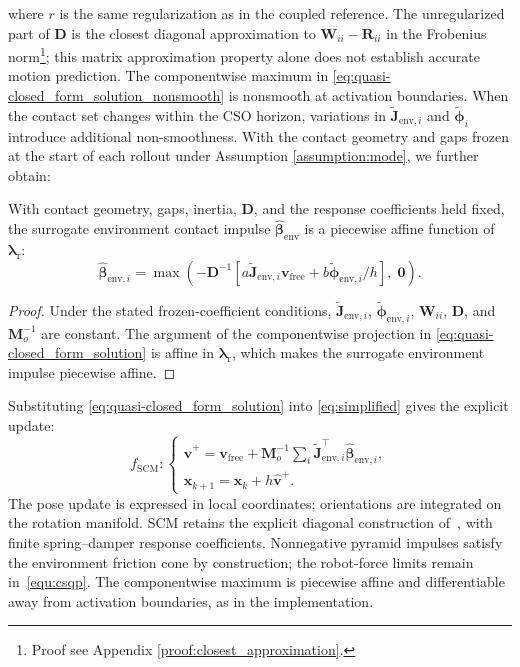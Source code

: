 where $r$ is the same regularization as in the coupled reference. The unregularized part of $\boldsymbol{D}$ is the closest diagonal approximation to $\boldsymbol{W}_{ii}-\boldsymbol{R}_{ii}$ in the Frobenius norm\footnote{Proof see Appendix \ref{proof:closest_approximation}.}; this matrix approximation property alone does not establish accurate motion prediction. The componentwise maximum in \eqref{eq:quasi-closed_form_solution_nonsmooth} is nonsmooth at activation boundaries. When the contact set changes within the CSO horizon, variations in $\boldsymbol{\tilde{J}}_{\text{env},i}$ and $\boldsymbol{\tilde{\phi}}_i$ introduce additional non-smoothness. With the contact geometry and gaps frozen at the start of each rollout under Assumption \ref{assumption:mode}, we further obtain:
\begin{lemma}\label{lemma2:piecewise-linear}
With contact geometry, gaps, inertia, $\boldsymbol{D}$, and the response coefficients held fixed, the surrogate environment contact impulse $\boldsymbol{\hat{\beta}}_{\text{env}}$ is a piecewise affine function of $\boldsymbol{\lambda}_{\text{r}}$:
\begin{equation}
\boldsymbol{\hat{\beta}}_{\text{env}, i}
=
\max
\left(
-
\boldsymbol{D}^{-1}
\left[
a\boldsymbol{\tilde{J}}_{\text{env},i} \boldsymbol{v}_{\mathrm{free}}
+b\boldsymbol{\tilde{\phi}}_{\text{env},i}/h
\right],
\;\boldsymbol{0}
\right).
\label{eq:quasi-closed_form_solution}
\end{equation}
\end{lemma}
\begin{proof}
 \renewcommand{\qedsymbol}{}
 Under the stated frozen-coefficient conditions, $\boldsymbol{\tilde{J}}_{\text{env},i}$, $\boldsymbol{\tilde{\phi}}_{\text{env},i}$, $\boldsymbol{W}_{ii}$, $\boldsymbol{D}$, and $\boldsymbol{M}_o^{-1}$ are constant. The argument of the componentwise projection in \eqref{eq:quasi-closed_form_solution} is affine in $\boldsymbol{\lambda}_{\mathrm r}$, which makes the surrogate environment impulse piecewise affine.
\end{proof}
Substituting \eqref{eq:quasi-closed_form_solution} into \eqref{eq:simplified} gives the explicit update:
\begin{equation}
f_{\mathrm{SCM}}:\begin{cases}
\hat{\boldsymbol{v}}^+=\boldsymbol{v}_{\mathrm{free}}+
\boldsymbol{M}_o^{-1}\sum_i\boldsymbol{\tilde J}_{\mathrm{env},i}^\top
\hat{\boldsymbol{\beta}}_{\mathrm{env},i},\\
\hat{\boldsymbol{x}}_{k+1}=\boldsymbol{x}_k+h\hat{\boldsymbol{v}}^+.
\end{cases}
\label{equ:scm}
\end{equation}
The pose update is expressed in local coordinates; orientations are integrated on the rotation manifold. SCM retains the explicit diagonal construction of~\cite{jin2024complementarity}, with finite spring--damper response coefficients. Nonnegative pyramid impulses satisfy the environment friction cone by construction; the robot-force limits remain in~\eqref{equ:csqp}. The componentwise maximum is piecewise affine and differentiable away from activation boundaries, as in the implementation.

